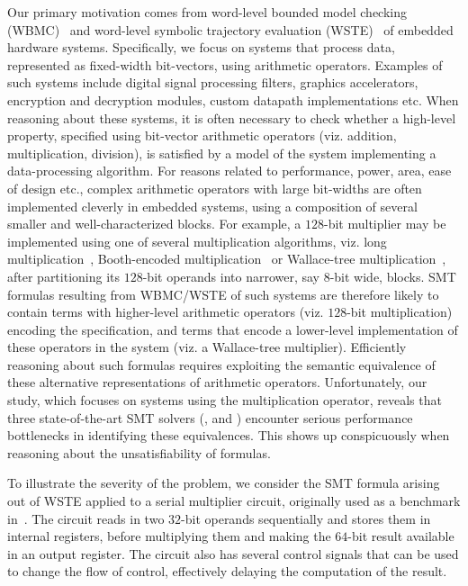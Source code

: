 Our primary motivation comes from word-level bounded model checking
(WBMC)~\cite{cbmc,hwcbmc} and word-level symbolic trajectory
evaluation (WSTE)~\cite{wste} of embedded hardware systems.
Specifically, we focus on systems that process data, represented as
fixed-width bit-vectors, using arithmetic operators.  Examples of such
systems include digital signal processing filters, graphics
accelerators, encryption and decryption modules, custom datapath
implementations etc.  When reasoning about these systems, it is often
necessary to check whether a high-level property, specified using
bit-vector arithmetic operators (viz. addition, multiplication,
division), is satisfied by a model of the system implementing a
data-processing algorithm.  For reasons related to performance, power,
area, ease of design etc., complex arithmetic operators with large
bit-widths are often implemented cleverly in embedded systems, using a
composition of several smaller and well-characterized blocks.  For
example, a $128$-bit multiplier may be implemented using one of
several multiplication algorithms, viz. long
multiplication~\cite{long}, Booth-encoded
multiplication~\cite{booth} or Wallace-tree
multiplication~\cite{wallace}, after partitioning its $128$-bit
operands into narrower, say $8$-bit wide, blocks.  SMT formulas
resulting from WBMC/WSTE of such systems are therefore likely to
contain terms with higher-level arithmetic operators (viz. $128$-bit
multiplication) encoding the specification, and terms that encode a
lower-level implementation of these operators in the system (viz. a
Wallace-tree multiplier).  Efficiently reasoning about such formulas
requires exploiting the semantic equivalence of these alternative
representations of arithmetic operators.  Unfortunately, our study,
which focuses on systems using the multiplication operator, reveals
that three state-of-the-art SMT solvers ({\zthree}, {\cvcfour} and
{\boolector}) encounter serious performance bottlenecks in identifying
these equivalences.  This shows up conspicuously when reasoning about
the unsatisfiability of formulas.

 To illustrate
the severity of the problem, we consider the SMT formula arising out
of WSTE applied to a serial multiplier circuit, originally used as a
benchmark in~\cite{wste}.  The circuit reads in two $32$-bit operands
sequentially and stores them in internal registers, before multiplying
them and making the $64$-bit result available in an output register.
The circuit also has several control signals that can be used to
change the flow of control, effectively delaying the computation of
the result.

